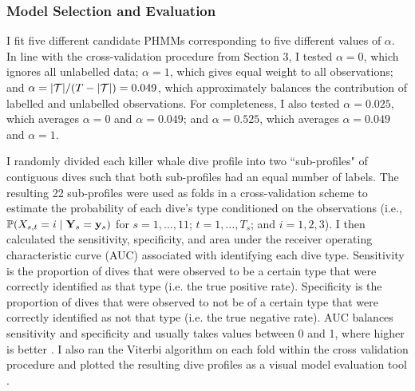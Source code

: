 \subsubsection{Model Selection and Evaluation}

I fit five different candidate PHMMs corresponding to five different values of $\alpha$. In line with the cross-validation procedure from Section 3, I tested $\alpha = 0$, which ignores all unlabelled data; $\alpha = 1$, which gives equal weight to all observations; and $\alpha = |\mathcal{T}| / (T - |\mathcal{T}|) = 0.049$, which approximately balances the contribution of labelled and unlabelled observations. For completeness, I also tested $\alpha = 0.025$, which averages $\alpha = 0$ and $\alpha = 0.049$; and $\alpha = 0.525$, which averages $\alpha = 0.049$ and $\alpha = 1$.

I randomly divided each killer whale dive profile into two ``sub-profiles" of contiguous dives such that both sub-profiles had an equal number of labels. The resulting 22 sub-profiles were used as folds in a cross-validation scheme to estimate the probability of each dive's type conditioned on the observations (i.e., $\mathbb{P}(X_{s,t} = i \mid \mathbf{Y}_s = \mathbf{y}_s)$ for $s = 1,\ldots,11$; $t = 1,\ldots,T_s$; and $i = 1,2,3$). I then calculated the sensitivity, specificity, and area under the receiver operating characteristic curve (AUC) associated with identifying each dive type. Sensitivity is the proportion of dives that were observed to be a certain type that were correctly identified as that type (i.e. the true positive rate). Specificity is the proportion of dives that were observed to not be of a certain type that were correctly identified as not that type (i.e. the true negative rate). AUC balances sensitivity and specificity and usually takes values between 0 and 1, where higher is better \citep{Bradley:1997}. I also ran the Viterbi algorithm on each fold within the cross validation procedure and plotted the resulting dive profiles as a visual model evaluation tool \citep{Viterbi:1967}.


